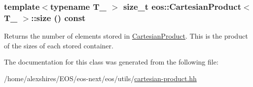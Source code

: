 \hypertarget{classeos_1_1CartesianProduct_a5825cf1120b0464a9ce21c65239f0c9b}{
\subsubsection[{size}]{\setlength{\rightskip}{0pt plus 5cm}template$<$typename T\_\- $>$ size\_\-t {\bf eos::CartesianProduct}$<$ T\_\- $>$::size () const}}
\label{classeos_1_1CartesianProduct_a5825cf1120b0464a9ce21c65239f0c9b}
Returns the number of elements stored in \hyperlink{classeos_1_1CartesianProduct}{CartesianProduct}. This is the product of the sizes of each stored container. 

The documentation for this class was generated from the following file:\begin{DoxyCompactItemize}
\item 
/home/alexshires/EOS/eos-\/next/eos/utils/\hyperlink{cartesian-product_8hh}{cartesian-\/product.hh}\end{DoxyCompactItemize}
